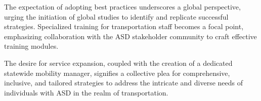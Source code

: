     The expectation of adopting best practices underscores a global perspective, urging the initiation of global studies to identify and replicate successful strategies. Specialized training for transportation staff becomes a focal point, emphasizing collaboration with the ASD stakeholder community to craft effective training modules. 
    
    The desire for service expansion, coupled with the creation of a dedicated statewide mobility manager, signifies a collective plea for comprehensive, inclusive, and tailored strategies to address the intricate and diverse needs of individuals with ASD in the realm of transportation.

